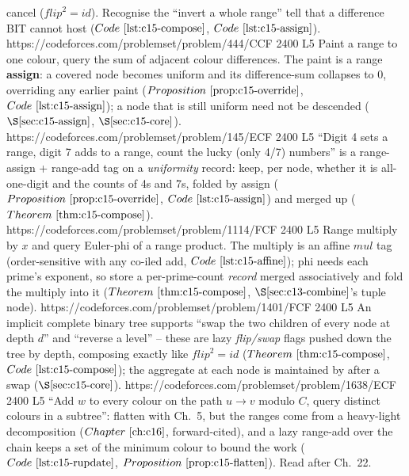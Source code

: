 \begin{mixedset}
{     cancel (\(\mathit{flip}^2{=}\mathit{id}\)). Recognise the ``invert a whole range'' tell
     that a difference BIT cannot host (\(\coderef{c15-compose}\), \(\coderef{c15-assign}\)).}
    {https://codeforces.com/problemset/problem/444/C}{CF 2400 L5}
    {Paint a range to one colour, query the sum of adjacent colour differences. The paint
     is a range \textbf{assign}: a covered node becomes uniform and its difference-sum
     collapses to \(0\), overriding any earlier paint (\(\propref{c15-override}\),
     \(\coderef{c15-assign}\)); a node that is still uniform need not be descended
     (\(\secref{c15-assign}\), \(\secref{c15-core}\)).}
    {https://codeforces.com/problemset/problem/145/E}{CF 2400 L5}
    {``Digit 4 sets a range, digit 7 adds to a range, count the lucky (only 4/7) numbers''
     is a range-assign + range-add tag on a \emph{uniformity} record: keep, per node,
     whether it is all-one-digit and the counts of 4s and 7s, folded by assign
     (\(\propref{c15-override}\), \(\coderef{c15-assign}\)) and merged up (\(\thmref{c15-compose}\)).}
    {https://codeforces.com/problemset/problem/1114/F}{CF 2400 L5}
    {Range multiply by \(x\) and query Euler-phi of a range product. The multiply is an
     affine \(\mathit{mul}\) tag (order-sensitive with any co-iled add,
     \(\coderef{c15-affine}\)); phi needs each prime's exponent, so store a
     per-prime-count \emph{record} merged associatively and fold the multiply into it
     (\(\thmref{c15-compose}\), \(\secref{c13-combine}\)'s tuple node).}
    {https://codeforces.com/problemset/problem/1401/F}{CF 2400 L5}
    {An implicit complete binary tree supports ``swap the two children of every node at
     depth \(d\)'' and ``reverse a level'' -- these are lazy \emph{flip/swap} flags pushed
     down the tree by depth, composing exactly like \(\mathit{flip}^2{=}\mathit{id}\)
     (\(\thmref{c15-compose}\), \(\coderef{c15-compose}\)); the aggregate at each node is
     maintained by  after a swap (\(\secref{c15-core}\)).}
    {https://codeforces.com/problemset/problem/1638/E}{CF 2400 L5}
    {``Add \(w\) to every colour on the path \(u\!\to\!v\) modulo \(C\), query distinct
     colours in a subtree'': flatten with Ch.~5, but the ranges come from a
     heavy-light decomposition (\(\chref{c16}\), forward-cited), and a lazy range-add over
     the chain keeps a set of the minimum colour to bound the work
     (\(\coderef{c15-rupdate}\), \(\propref{c15-flatten}\)). Read after Ch.~22.}
\end{mixedset}

